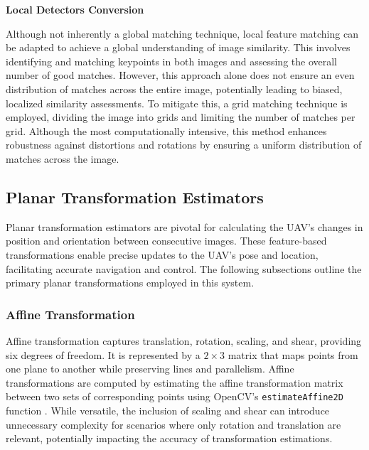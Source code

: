 \textbf{Local Detectors Conversion}

Although not inherently a global matching technique, local feature matching can be adapted to achieve a global understanding of image similarity. This involves identifying and matching keypoints in both images and assessing the overall number of good matches. However, this approach alone does not ensure an even distribution of matches across the entire image, potentially leading to biased, localized similarity assessments. To mitigate this, a grid matching technique is employed, dividing the image into grids and limiting the number of matches per grid. Although the most computationally intensive, this method enhances robustness against distortions and rotations by ensuring a uniform distribution of matches across the image.





\subsection{Planar Transformation Estimators}

Planar transformation estimators are pivotal for calculating the UAV's changes in position and orientation between consecutive images. These feature-based transformations enable precise updates to the UAV's pose and location, facilitating accurate navigation and control. The following subsections outline the primary planar transformations employed in this system.

\subsubsection{Affine Transformation}

Affine transformation captures translation, rotation, scaling, and shear, providing six degrees of freedom. It is represented by a  \(2 \times 3\) matrix that maps points from one plane to another while preserving lines and parallelism. Affine transformations are computed by estimating the affine transformation matrix between two sets of corresponding points using OpenCV's \texttt{estimateAffine2D} function \cite{opencv_warp_affine}. While versatile, the inclusion of scaling and shear can introduce unnecessary complexity for scenarios where only rotation and translation are relevant, potentially impacting the accuracy of transformation estimations.

